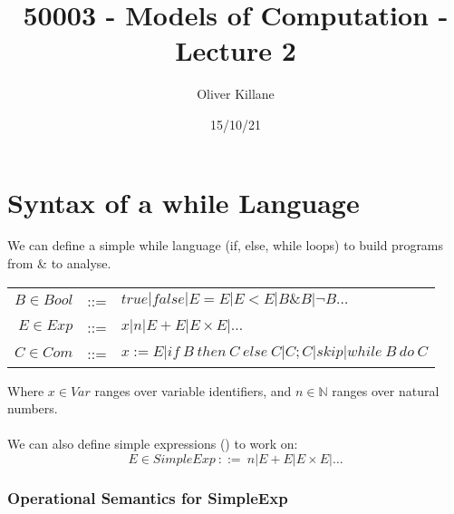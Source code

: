 \documentclass{report}
\title{50003 - Models of Computation - Lecture 2}
\author{Oliver Killane}
\date{15/10/21}
\begin{document}
    \maketitle

    \section*{Syntax of a while Language}
        We can define a simple while language (if, else, while loops) to build programs from \& to analyse.
        \begin{center}
            \begin{tabular}{r c l}
                $B \in Bool$ & ::= & $true | false | E = E | E < E | B \& B | \neg B \dots$ \\
                $E \in Exp$ & ::= & $x | n | E + E | E \times E | \dots$ \\
                $C \in Com$ & ::= & $x :=E | if \ B \ then \ C \ else \ C | C;C | skip | while \ B \ do \ C$ \\
            \end{tabular}
        \end{center}
        Where $x \in Var$ ranges over variable identifiers, and $n \in \mathbb{N}$ ranges over natural numbers.
        \\
        \\ We can also define simple expressions () to work on:
        \[E \in SimpleExp \ ::= \ n | E + E | E \times E | \dots\]
        \subsubsection*{Operational Semantics for SimpleExp}
            \begin{itemize}
            \end{itemize}
\end{document}
